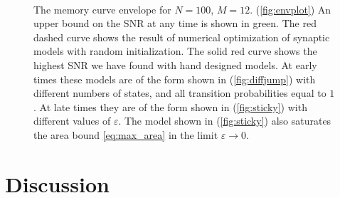 \documentclass{article} %
\begin{document}
\begin{figure}
 \begin{center}
 \begin{myenuma}
 \parbox[t]{0.44\linewidth}{
  \item{}\label{fig:envplot}
  }\hp
  \parbox[t]{0.45\linewidth}{
  \item{}\label{fig:diffjump}\\[0.1\linewidth]
  \item{}\label{fig:sticky}
  }
 \end{myenuma}
 \end{center}
  \caption{The memory curve envelope for $N=100$, $M=12$.
  (\ref{fig:envplot}) An upper bound on the SNR at any time is shown in green.
  The red dashed curve shows the result of numerical optimization of synaptic models with random initialization.
  The solid red curve shows the highest SNR we have found with hand designed models.
  At early times these models are of the form shown in (\ref{fig:diffjump}) with different numbers of states, and all transition probabilities equal to $1$.
  At late times they are of the form shown in (\ref{fig:sticky}) with different values of $\varepsilon$.
  The model shown in (\ref{fig:sticky}) also saturates the area bound \eqref{eq:max_area} in the limit $\varepsilon\to0$.
  }\label{fig:env}
\end{figure}







\section{Discussion}\label{sec:disc}
\end{document}
